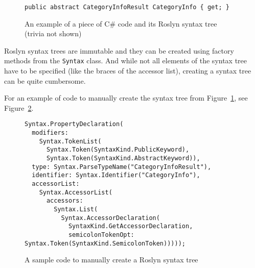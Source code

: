 \begin{figure}[htbp]

\begin{lstlisting}
public abstract CategoryInfoResult CategoryInfo { get; }
\end{lstlisting}

\begin{center}
\end{center}

\caption{An example of a piece of C\# code and its Roslyn syntax tree \\ (trivia not shown)}
\label{Syntax tree}
\end{figure}

Roslyn syntax trees are immutable and they can be created using factory methods from the \lstinline{Syntax} class.
And while not all elements of the syntax tree have to be specified (like the braces of the accessor list),
creating a syntax tree can be quite cumbersome.

For an example of code to manually create the syntax tree from Figure~\ref{Syntax tree}, see Figure~\ref{Roslyn code}.

\begin{figure}[htbp]

\begin{lstlisting}
Syntax.PropertyDeclaration(
  modifiers:
    Syntax.TokenList(
      Syntax.Token(SyntaxKind.PublicKeyword),
      Syntax.Token(SyntaxKind.AbstractKeyword)),
  type: Syntax.ParseTypeName("CategoryInfoResult"),
  identifier: Syntax.Identifier("CategoryInfo"),
  accessorList:
    Syntax.AccessorList(
      accessors:
        Syntax.List(
          Syntax.AccessorDeclaration(
            SyntaxKind.GetAccessorDeclaration,
            semicolonTokenOpt: Syntax.Token(SyntaxKind.SemicolonToken)))));
\end{lstlisting}

\caption{A sample code to manually create a Roslyn syntax tree}
\label{Roslyn code}
\end{figure}